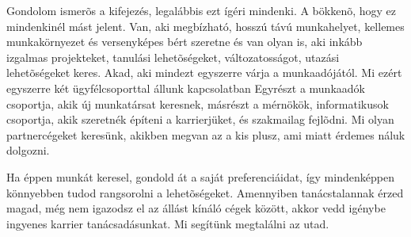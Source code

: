\documentclass[a4paper]{article}
\begin{document}
Gondolom ismerõs a kifejezés, legalábbis ezt ígéri mindenki. A bökkenõ, hogy ez mindenkinél mást jelent. Van, aki megbízható, hosszú távú munkahelyet, kellemes munkakörnyezet és versenyképes bért szeretne és van olyan is, aki inkább izgalmas projekteket, tanulási lehetõségeket, változatosságot, utazási lehetõségeket keres. Akad, aki mindezt egyszerre várja a munkaadójától. Mi ezért egyszerre két ügyfélcsoporttal állunk kapcsolatban Egyrészt a munkaadók csoportja, akik új munkatársat keresnek, másrészt a mérnökök, informatikusok csoportja, akik szeretnék építeni a karrierjüket, és szakmailag fejlõdni. Mi olyan partnercégeket keresünk, akikben megvan az a kis plusz, ami miatt érdemes náluk dolgozni.

Ha éppen munkát keresel, gondold át a saját preferenciáidat, így mindenképpen könnyebben tudod rangsorolni a lehetõségeket. Amennyiben tanácstalannak érzed magad, még nem igazodsz el az állást kínáló cégek között, akkor vedd igénybe ingyenes karrier tanácsadásunkat. Mi segítünk megtalálni az utad.
\end{document}
